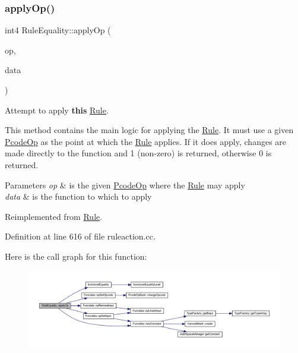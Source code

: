 \subsubsection{\texorpdfstring{applyOp()}{applyOp()}}
{\footnotesize\ttfamily int4 Rule\+Equality\+::apply\+Op (\begin{DoxyParamCaption}\item[{\mbox{\hyperlink{class_pcode_op}{Pcode\+Op}} $\ast$}]{op,  }\item[{\mbox{\hyperlink{class_funcdata}{Funcdata}} \&}]{data }\end{DoxyParamCaption})\hspace{0.3cm}{\ttfamily [virtual]}}



Attempt to apply {\bfseries{this}} \mbox{\hyperlink{class_rule}{Rule}}. 

This method contains the main logic for applying the \mbox{\hyperlink{class_rule}{Rule}}. It must use a given \mbox{\hyperlink{class_pcode_op}{Pcode\+Op}} as the point at which the \mbox{\hyperlink{class_rule}{Rule}} applies. If it does apply, changes are made directly to the function and 1 (non-\/zero) is returned, otherwise 0 is returned. 
\begin{DoxyParams}{Parameters}
{\em op} & is the given \mbox{\hyperlink{class_pcode_op}{Pcode\+Op}} where the \mbox{\hyperlink{class_rule}{Rule}} may apply \\
\hline
{\em data} & is the function to which to apply \\
\hline
\end{DoxyParams}


Reimplemented from \mbox{\hyperlink{class_rule_a4e3e61f066670175009f60fb9dc60848}{Rule}}.



Definition at line 616 of file ruleaction.\+cc.

Here is the call graph for this function\+:
\nopagebreak
\begin{figure}[H]
\begin{center}
\leavevmode
\includegraphics[width=350pt]{class_rule_equality_a1eec6d7734884df00533e207ead6de4b_cgraph}
\end{center}
\end{figure}
\mbox{\label{class_rule_equality_a78a0d12ca064653dd2ed59dee9d01cd3}} 
